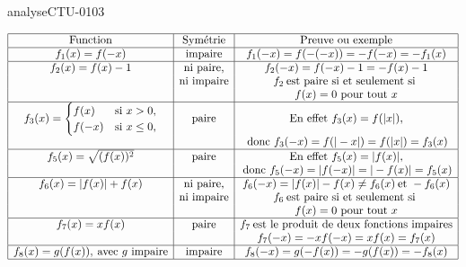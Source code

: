 \begin{corrige}{analyseCTU-0103}
\begin{enumerate}
\begin{equation*}
        \begin{array}{|c|c|c|}
         \hline
         \text{Function} & \text{Sym\'etrie} & \text{Preuve ou exemple}\\
          \hline
            f_1 (x) = f(-x) & \text{impaire} & f_1 (-x) = f(-(-x)) = -f(-x) = -f_1(x) \\
            \hline
            f_2 (x) = f(x)-1 & \text{ ni paire, } & f_2 (-x) = f(-x)-1 =-f(x)-1  \\
                             &\text{ni impaire}&f_2 \:\text{est paire si et seulement si } \\
                             &                 &f(x) = 0\text{ pour tout }x\\
            \hline
            f_3 (x)= 
            \begin{cases}
              f(x) &\text{si } x>0, \\
              f(-x)& \text{si } x\leq 0,
            \end{cases} &\text{paire} & \text{En effet } f_3(x) = f(|x|),\\
            && \:\text{donc } f_3(-x) = f(|-x|)= f(|x|) = f_3 (x) \\
            \hline
            f_5(x) = \sqrt{(f(x))^2} &\text{paire}& \text{En effet } f_5(x) = |f(x)|,\\
            && \:\text{donc } f_5(-x) = |f(-x)| = |-f(x)| = f_5(x)\\
            \hline
            f_6(x)= |f(x)| + f(x) &\text{ ni paire, }& f_6(-x) = |f(x)| - f(x) \neq f_6(x)\:\text{et } -f_6(x)  \\
                                  &\text{ni impaire} & f_6 \:\text{est paire si et seulement si }\\   
                                  &                  & f (x) = 0\text{ pour tout }x\\
            \hline
            f_7(x) = xf(x)&\text{paire}& f_7 \: \text{est le produit de deux fonctions impaires} \\
            &&f_7(-x) = -xf(-x) = xf(x) = f_7(x)\\
            \hline
            f_8(x) = g(f(x)), \:\text{avec }g \text{ impaire}   &\text{impaire}& f_8(-x) = g(-f(x))= -g(f(x))=-f_8(x) \\
\hline
        \end{array}
      \end{equation*}
  \end{enumerate} 
\end{corrige}
